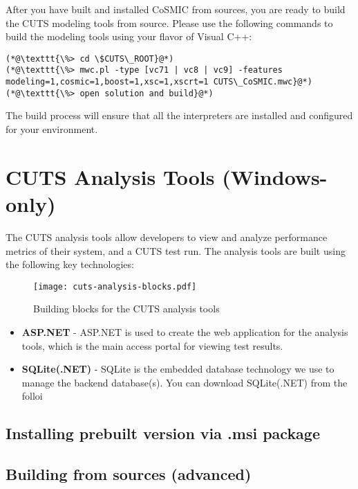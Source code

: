 After you have built and installed CoSMIC from sources, you are ready to build
the CUTS modeling tools from source. Please use the following commands to 
build the modeling tools using your flavor of Visual C++:

\begin{lstlisting}
(*@\texttt{\%> cd \$CUTS\_ROOT}@*)
(*@\texttt{\%> mwc.pl -type [vc71 | vc8 | vc9] -features modeling=1,cosmic=1,boost=1,xsc=1,xscrt=1 CUTS\_CoSMIC.mwc}@*)
(*@\texttt{\%> open solution and build}@*)
\end{lstlisting}

\noindent The build process will ensure that all the interpreters are installed
and configured for your environment.

\section{CUTS Analysis Tools (Windows-only)}

The CUTS analysis tools allow developers to view and analyze performance metrics
of their system, and a CUTS test run. The analysis tools are built using the 
following key technologies:


\begin{figure}[htbp]
  \centering
  \texttt{[image: cuts-analysis-blocks.pdf]}
  \caption{Building blocks for the CUTS analysis tools}
  \label{fig:cuts-analysis-blocks}
\end{figure}

\begin{itemize}
  \item \textbf{ASP.NET} - ASP.NET is used to create the web application
  for the analysis tools, which is the main access portal for viewing 
  test results.

  \item \textbf{SQLite(.NET)} - SQLite is the embedded database technology
  we use to manage the backend database(s). You can download SQLite(.NET) 
  from the folloi
\end{itemize}

\subsection{Installing prebuilt version via .msi package}

\subsection{Building from sources (advanced)}

